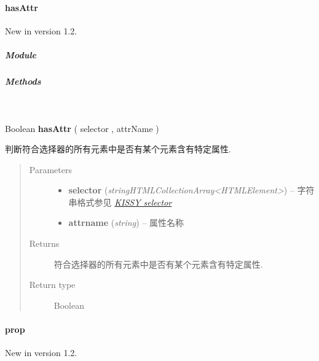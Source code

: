 \documentclass[letterpaper,10pt,english]{sphinxmanual}
\begin{document}
\paragraph{hasAttr}
\label{api/core/dom/hasAttr::doc}\label{api/core/dom/hasAttr:hasattr}New in version 1.2.

\subparagraph{Module}
\label{api/core/dom/hasAttr:module}\begin{quote}

{\hyperref[api/core/dom/index:module-DOM]{}}
\end{quote}


\subparagraph{Methods}
\label{api/core/dom/hasAttr:methods}

\begin{fulllineitems}
\label{api/core/dom/hasAttr:DOM.hasAttr}~
\begin{DUlineblock}{0em}
\item[] Boolean \textbf{hasAttr} ( selector , attrName )
\item[] 判断符合选择器的所有元素中是否有某个元素含有特定属性.
\end{DUlineblock}
\begin{quote}\begin{description}
\item[{Parameters}] \leavevmode\begin{itemize}
\item {}
\textbf{selector} (\emph{string\textbar{}HTMLCollection\textbar{}Array\textless{}HTMLElement\textgreater{}}) -- 字符串格式参见 {\hyperref[api/core/dom/selector:dom-selector]{\emph{KISSY selector}}}

\item {}
\textbf{attrname} (\emph{string}) -- 属性名称

\end{itemize}

\item[{Returns}] \leavevmode
符合选择器的所有元素中是否有某个元素含有特定属性.

\item[{Return type}] \leavevmode
Boolean

\end{description}\end{quote}

\end{fulllineitems}



\paragraph{prop}
\label{api/core/dom/prop::doc}\label{api/core/dom/prop:prop}New in version 1.2.
\end{document}
